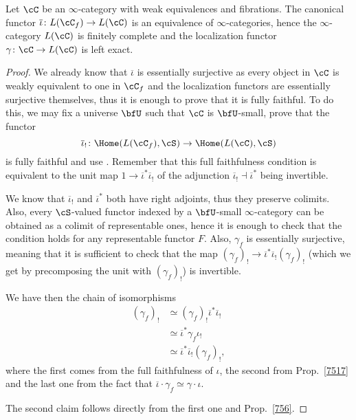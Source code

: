 \begin{prop}\label{7518}

  Let $\cC$ be an $\infty$-category with weak equivalences and fibrations. The
  canonical functor $\overline{\iota}\colon L(\cC_f)\rightarrow L(\cC)$ is an
  equivalence of $\infty$-categories, hence the $\infty$-category $L(\cC)$ is
  finitely complete and the localization functor $\gamma\colon\cC\rightarrow
  L(\cC)$ is left exact.
\end{prop}
\begin{proof}

  We already know that $\overline{\iota}$ is essentially surjective as every
  object in $\cC$ is weakly equivalent to one in $\cC_f$ and the localization
  functors are essentially surjective themselves, thus it is enough to prove
  that it is fully faithful. To do this, we may fix a universe $\bfU$ such that
  $\cC$ is $\bfU$-small, prove that the functor
  \[\overline{\iota}_!\colon\Home(L(\cC_f),\cS)\rightarrow\Home(L(\cC),\cS)\]
  is fully faithful and use \cite[Prop.\ 6.1.15]{Cis19}. Remember that this full
  faithfulness condition is equivalent to the unit map
  $1\rightarrow\overline{\iota}^*\overline{\iota}_!$ of the adjunction
  $\overline{\iota}_!\dashv\overline{\iota}^*$ being invertible.

  We know that $\overline{\iota}_!$ and $\overline{\iota}^*$ both have right
  adjoints, thus they preserve colimits. Also, every $\cS$-valued functor
  indexed by a $\bfU$-small $\infty$-category can be obtained as a colimit of
  representable ones, hence it is enough to check that the condition holds for
  any representable functor $F$. Also, $\gamma_f$ is essentially surjective,
  meaning that it is sufficient to check that the map
  $(\gamma_f)_!\rightarrow\overline{\iota}^*\overline{\iota}_!(\gamma_f)_!$
  (which we get by precomposing the unit with $(\gamma_f)_!$) is invertible.

  We have then the chain of isomorphisms
  \begin{align*}
    (\gamma_f)_! &\simeq(\gamma_f)_!\overline{\iota}^*\overline{\iota}_! \\
                 &\simeq\overline{\iota}^*\gamma_f\iota_! \\
                 &\simeq\overline{\iota}^*\overline{\iota}_!(\gamma_f)_!,
  \end{align*}
  where the first comes from the full faithfulness of $\iota$, the
  second from Prop.\ \ref{7517} and the last one from the fact that
  $\overline{\iota}\cdot\gamma_f\simeq\gamma\cdot\iota$.

  The second claim follows directly from the first one and Prop.\ \ref{756}.
\end{proof}

